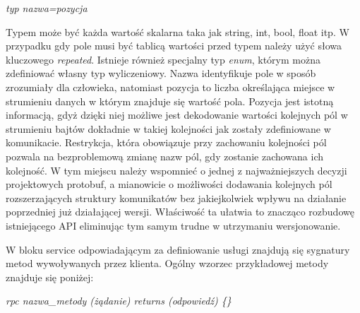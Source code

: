 \centerline{\textit{typ nazwa=pozycja}}
\noindent
Typem może być każda wartość skalarna taka jak string, int, bool, float itp. W przypadku gdy pole musi być tablicą wartości przed typem należy użyć słowa kluczowego \textit{repeated}. Istnieje również specjalny typ \textit{enum}, którym można zdefiniować własny typ wyliczeniowy. Nazwa identyfikuje pole w sposób zrozumiały dla człowieka, natomiast pozycja to liczba określająca miejsce w strumieniu danych w którym znajduje się wartość pola. Pozycja jest istotną informacją, gdyż dzięki niej możliwe jest dekodowanie wartości kolejnych pól w strumieniu bajtów dokładnie w takiej kolejności jak zostały zdefiniowane w komunikacie. Restrykcja, która obowiązuje przy zachowaniu kolejności pól pozwala na bezproblemową zmianę nazw pól, gdy zostanie zachowana ich kolejność. W tym miejscu należy wspomnieć o jednej z najważniejszych decyzji projektowych protobuf, a mianowicie o możliwości dodawania kolejnych pól rozszerzających struktury komunikatów bez jakiejkolwiek wpływu na działanie poprzedniej już działającej wersji. Właściwość ta ułatwia to znacząco rozbudowę istniejącego API eliminując tym samym trudne w utrzymaniu wersjonowanie. 
\par W bloku service odpowiadającym za definiowanie usługi znajdują się sygnatury metod wywoływanych przez klienta. Ogólny wzorzec przykładowej metody znajduje się poniżej:

\centerline{\textit{rpc nazwa\_metody (żądanie) returns (odpowiedź) \{\}}}

